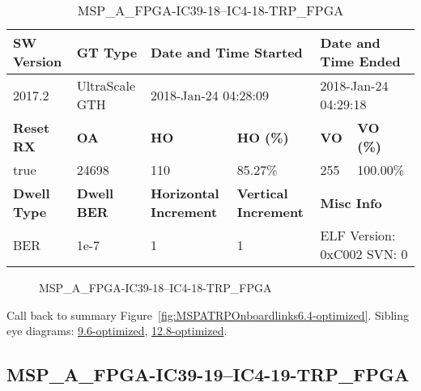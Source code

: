 \begin{table}[h]
\centering
\caption{MSP\_A\_FPGA-IC39-18--IC4-18-TRP\_FPGA}
\label{tab:MSPAFPGAIC3918IC418TRPFPGA6.4-optimized}
\begin{tabular}{@{}|l|l|l|l|l|l|@{}}
\toprule
\textbf{SW Version}                & \textbf{GT Type}   & \multicolumn{2}{l|}{\textbf{Date and Time Started}}            & \multicolumn{2}{l|}{\textbf{Date and Time Ended}}        \\ \midrule
2017.2                       & UltraScale GTH          & \multicolumn{2}{l|}{2018-Jan-24 04:28:09}                   & \multicolumn{2}{l|}{2018-Jan-24 04:29:18}               \\ \midrule
\textbf{Reset RX}                  & \textbf{OA} & \textbf{HO}   & \textbf{HO (\%)} & \textbf{VO} & \textbf{VO (\%)} \\ \midrule
true & 24698        & 110          & 85.27\%        & 255        & 100.00\%       \\ \midrule
\textbf{Dwell Type}                & \textbf{Dwell BER} & \textbf{Horizontal Increment} & \textbf{Vertical Increment}    & \multicolumn{2}{l|}{\textbf{Misc Info}}                  \\ \midrule
BER                            & 1e-7        & 1        & 1           & \multicolumn{2}{l|}{ELF Version: 0xC002 SVN: 0}                         \\ \bottomrule
\end{tabular}
\end{table}

\begin{figure}[h]
\caption{MSP\_A\_FPGA-IC39-18--IC4-18-TRP\_FPGA} \label{fig:MSPAFPGAIC3918IC418TRPFPGA6.4-optimized}
\end{figure}

Call back to summary Figure~\ref{fig:MSPATRPOnboardlinks6.4-optimized}.
Sibling eye diagrams: \hyperref[sec:MSPAFPGAIC3918IC418TRPFPGA9.6-optimized]{9.6-optimized}, \hyperref[sec:MSPAFPGAIC3918IC418TRPFPGA12.8-optimized]{12.8-optimized}.

\clearpage
\newpage


\subsection{MSP\_A\_FPGA-IC39-19--IC4-19-TRP\_FPGA}\label{sec:MSPAFPGAIC3919IC419TRPFPGA6.4-optimized}

